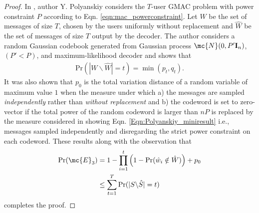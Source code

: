 \documentclass[final,onecolumn,12pt]{IEEEtran}
\def\Pr{\mathrm{Pr}}
\begin{document}
\begin{proof}
In \cite{polyanskiy17}, author Y. Polyanskiy considers the $T$-user GMAC problem with power constraint $P$ according to Eqn. \eqref{eqn:mac_powerconstraint}. Let $W$ be the set of messages of size $T$, chosen by the users uniformly without replacement and $\hat{W}$ be the set of messages of size $T$ output by the decoder. The author considers a random Gaussian codebook generated from Gaussian process $\mc{N}(0,P'\mathbf{I}_n)$,  $(P'<P)$, and maximum-likelihood decoder and shows that
\begin{align}
\Pr(|W\backslash \hat{W}|=t)=\min(p_t,q_t).
\label{Eqn:Polyanskiy_miniresult}
\end{align}
It was also shown that $p_0$ is the total variation distance of a random variable of maximum value $1$ when the measure under which a) the messages are sampled \textit{independently} rather than \textit{without replacement} and b) the codeword is set to zero-vector if the total power of the random codeword is larger than $nP$ is replaced by the measure considered in showing Eqn. \eqref{Eqn:Polyanskiy_miniresult} i.e., messages sampled independently and disregarding the strict power constraint on each codeword. These results along with the observation that
\begin{align*}
\Pr(\mc{E}_3)&=1-\prod_{i=1}^{t}\left(1-\Pr(\hat{w}_i\notin\hat{W})\right)+p_0\\
					&\leq\sum_{t=1}^{T} \Pr(|S\backslash\hat{S}|=t)
\end{align*}
completes the proof.
\end{proof}
\end{document}

